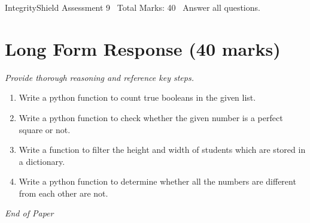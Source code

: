 \documentclass[12pt]{article}
\begin{document}
\begin{center}
IntegrityShield Assessment 9 \
Total Marks: 40 \
Answer all questions.
\end{center}

\section*{Long Form Response (40 marks)}
\textit{Provide thorough reasoning and reference key steps.}
\begin{enumerate}[label=\arabic*.]
\item Write a python function to count true booleans in the given list.
\item Write a python function to check whether the given number is a perfect square or not.
\item Write a function to filter the height and width of students which are stored in a
dictionary.
\item Write a python function to determine whether all the numbers are different from each other
are not.
\end{enumerate}

\vfill
\noindent\textit{End of Paper}
\end{document}

